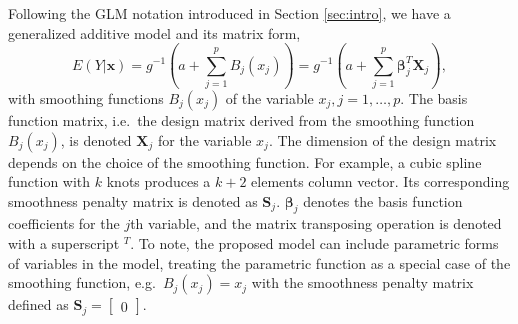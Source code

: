 \documentclass[AMA,STIX1COL,]{WileyNJD-v2}
\begin{document}
Following the GLM notation introduced in Section \ref{sec:intro}, we
have a generalized additive model and its matrix form,
\begin{equation}\label{eq:gam}
E(Y|\boldsymbol{x}) = g^{-1}(a + \sum\limits^p_{j=1}B_j(x_j)) = g^{-1}(a + \sum\limits^p_{j=1} \boldsymbol{\beta}_j^T \boldsymbol{X}_j),
\end{equation} with smoothing functions \(B_j(x_j)\) of the variable
\(x_j, j = 1, \dots, p.\) The basis function matrix, i.e.~the design
matrix derived from the smoothing function \(B_j(x_j)\), is denoted
\(\boldsymbol{X}_j\) for the variable \(x_j\). The dimension of the
design matrix depends on the choice of the smoothing function. For
example, a cubic spline function with \(k\) knots produces a \(k+2\)
elements column vector. Its corresponding smoothness penalty matrix is
denoted as \(\boldsymbol{S}_j\). \(\boldsymbol{\beta}_j\) denotes the
basis function coefficients for the \(j\)th variable, and the matrix
transposing operation is denoted with a superscript \(^T\). To note, the
proposed model can include parametric forms of variables in the model,
treating the parametric function as a special case of the smoothing
function, e.g.~\(B_j(x_j) = x_j\) with the smoothness penalty matrix
defined as \(\boldsymbol{S}_j = \begin{bmatrix}0\end{bmatrix}\).
\end{document}
